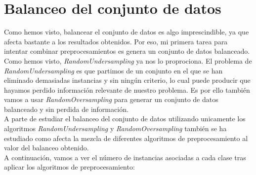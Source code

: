 \documentclass[11pt]{article}
\begin{document}
\section{Balanceo del conjunto de datos}

Como hemos visto, balancear el conjunto de datos es algo imprescindible, ya que afecta bastante a los resultados obtenidos. Por eso, mi primera tarea para intentar combinar preprocesamientos es genera un conjunto de datos balanceado. Como hemos visto, \textit{RandomUndersampling} ya nos lo proprociona. El problema de \textit{RandomUndersampling} es que partimos de un conjunto en el que se han eliminado demasiadas instancias y sin ningún criterio, lo cual puede producir que hayamos perdido información relevante de nuestro problema. Es por ello también vamos a usar \textit{RandomOversampling} para generar un conjunto de datos balanceado y sin perdida de información. \\

A parte de estudiar el balanceo del conjunto de datos utilizando unicamente los algoritmos \textit{RandomUndersampling} y \textit{RandomOversampling} también se ha estudiado como afecta la mezcla de diferentes algoritmos de preprocesamiento al valor del balanceo obtenido.\\

A continuación, vamos a ver el número de instancias asociadas a cada clase tras aplicar los algoritmos de preprocesamiento:

\begin{table}[H]
	\centering
\end{table}
\end{document}
